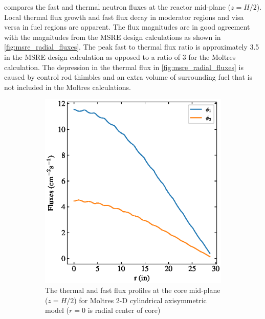 \documentclass{article}
\makeatletter
\def\maxwidth#1{\ifdim\Gin@nat@width>#1 #1\else\Gin@nat@width\fi}
\makeatother
\begin{document}
 compares the fast and thermal neutron fluxes at the
reactor mid-plane ($z=H/2$). Local thermal flux growth and fast flux decay in
moderator regions and visa versa in fuel regions are apparent. The flux
magnitudes are in good agreement with the magnitudes from the \gls{MSRE} design
calculations \cite[p. 92]{briggs_molten-salt_1964} as shown in
\cref{fig:msre_radial_fluxes}. The peak fast to thermal flux ratio is
approximately 3.5 in the \gls{MSRE} design calculation as opposed to a ratio of
3 for the Moltres calculation. The depression in the thermal flux in
\cref{fig:msre_radial_fluxes} is caused by control rod thimbles and an extra
volume of surrounding fuel that is not included in the Moltres calculations.

\begin{figure}[htpb]
    \centering
    \begin{subfigure}[b]{.5\textwidth}
      \includegraphics[width=\maxwidth{\textwidth}]{moltres_radial_fluxes.eps}
      \caption{The thermal and fast flux profiles at the core mid-plane
        ($z=H/2$) for Moltres 2-D cylindrical axisymmetric model ($r=0$ is radial center
        of core)}
      \label{fig:moltres_radial_fluxes}
    \end{subfigure}
    \begin{subfigure}[b]{.5\textwidth}

\end{subfigure}
\end{figure}
\end{document}

